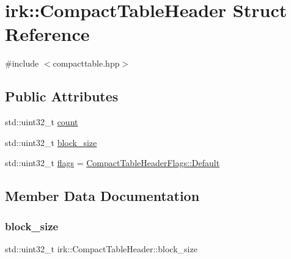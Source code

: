 \hypertarget{structirk_1_1CompactTableHeader}{}\section{irk\+:\+:Compact\+Table\+Header Struct Reference}
\label{structirk_1_1CompactTableHeader}


{\ttfamily \#include $<$compacttable.\+hpp$>$}

\subsection*{Public Attributes}
\begin{DoxyCompactItemize}
\item 
std\+::uint32\+\_\+t \mbox{\hyperlink{structirk_1_1CompactTableHeader_aa0a8452894e917ebb8aac9a7893c65ad}{count}}
\item 
std\+::uint32\+\_\+t \mbox{\hyperlink{structirk_1_1CompactTableHeader_aa10559bb6a69072f5c79a97a11fa9922}{block\+\_\+size}}
\item 
std\+::uint32\+\_\+t \mbox{\hyperlink{structirk_1_1CompactTableHeader_a2c71419d0680d872ae53eb578151d3b0}{flags}} = \mbox{\hyperlink{structirk_1_1CompactTableHeaderFlags_a18debbc227dbcb7726817a08b541e5e0}{Compact\+Table\+Header\+Flags\+::\+Default}}
\end{DoxyCompactItemize}


\subsection{Member Data Documentation}
\mbox{\label{structirk_1_1CompactTableHeader_aa10559bb6a69072f5c79a97a11fa9922}} 
\subsubsection{\texorpdfstring{block\+\_\+size}{block\_size}}
{\footnotesize\ttfamily std\+::uint32\+\_\+t irk\+::\+Compact\+Table\+Header\+::block\+\_\+size}

\mbox{\label{structirk_1_1CompactTableHeader_aa0a8452894e917ebb8aac9a7893c65ad}} 
